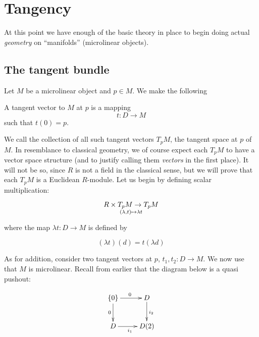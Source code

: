 \chapter{Tangency}

At this point we have enough of the basic theory in place to begin doing actual \emph{geometry} on ``manifolds'' (microlinear objects).

\section{The tangent bundle}

Let \( M \) be a microlinear object and \( p\in M \). We make the following

\begin{defn}
  A tangent vector to \( M \) at \( p \) is a mapping 
  \begin{equation*}
    t:D\to M
  \end{equation*}
  such that \( t(0)=p \).
\end{defn}

We call the collection of all such tangent vectors \( T_pM \), the tangent space at \( p \) of \( M \). In resemblance to classical geometry, we of course expect each \( T_pM \) to have a vector space structure (and to justify calling them \emph{vectors} in the first place). It will not be so, since \( R \) is not a field in the classical sense, but we will prove that each \( T_pM \) is a Euclidean \( R \)-module. Let us begin by defining scalar multiplication:

\begin{equation*}
  R\times T_pM \to T_pM \atop (\lambda,t)\mapsto \lambda t
\end{equation*}

where the map \( \lambda t: D\to M \) is defined by

\begin{equation*}
  (\lambda t)(d) = t(\lambda d)
\end{equation*}

As for addition, consider two tangent vectors at \( p \), \( t_1,t_2:D\to M \). We now use that \( M \) is microlinear. Recall from earlier that the diagram below is a quasi pushout:

\begin{equation}
  \xymatrix{
    {\{0\}} \ar[d]_0 \ar[r]^0   & D \ar[d]^{i_2} \\
    D \ar[r]_{i_1}              & D(2)
  }
  \label{dg:pushoutcopy}
\end{equation}

